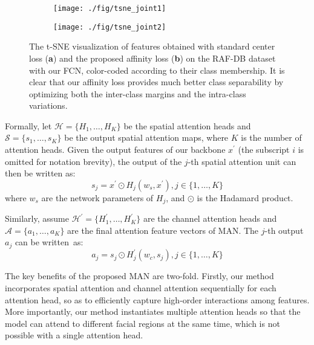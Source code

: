\documentclass{article}
\begin{document}
\begin{figure}[]
  \centering
  \begin{subfigure}[b]{0.48\textwidth}
\texttt{[image: ./fig/tsne\_joint1]}
    \captionsetup{justification=centering}
    \caption{}
    \vspace{2mm}
  \end{subfigure} 
\begin{subfigure}[b]{0.48\textwidth}
\texttt{[image: ./fig/tsne\_joint2]}
    \captionsetup{justification=centering}
    \caption{}
    \vspace{2mm}
  \end{subfigure}
  \caption{The t-SNE visualization of features obtained with standard center loss (\textbf{a}) and the proposed affinity loss (\textbf{b}) on the RAF-DB dataset with our FCN, color-coded according to their class membership. It is clear that our affinity loss provides much better class separability by optimizing both the inter-class margins and the intra-class variations.}
  \label{fig:tsne}
\end{figure}



Formally, let $\mathcal{H}= \{H_1,  \ldots  , H_K \}$ be the spatial attention heads and $\mathcal{S}= \{s_1,  \ldots  , s_K \}$ be the output spatial attention maps, where $K$ is the number of attention heads. {Given the output features of our backbone $x^{'}$ (the subscript $i$ is omitted for notation brevity), the output of the $j$-th spatial attention unit can then be written as:}
\begin{equation}
    s_j = x^{'} \odot H_j(w_s, x^{'}), j\in\{1, \ldots ,K\}
\end{equation}
\noindent where $w_s$ are the network parameters of $H_j$, {and $\odot$ is the Hadamard product.}

Similarly, {assume $\mathcal{H}^{'}= \{H^{'}_1,  \ldots  , H^{'}_K \}$ are the channel attention heads and \linebreak $\mathcal{A}= \{a_1,  \ldots  , a_K \}$ are the final attention feature vectors of MAN. The $j$-th output $a_j$ can be written~as:}
\begin{equation}
    a_j = s_j \odot H^{'}_{j}(w_c, s_j), j\in\{1, \ldots ,K\}
\end{equation}

The key benefits of the proposed MAN are two-fold. Firstly, our method incorporates spatial attention and channel attention sequentially for each attention head, so as to efficiently capture high-order interactions among features. More importantly, our method instantiates multiple attention heads so that the model can attend to different facial regions at the same time, which is not possible with a single attention head.
\end{document}
